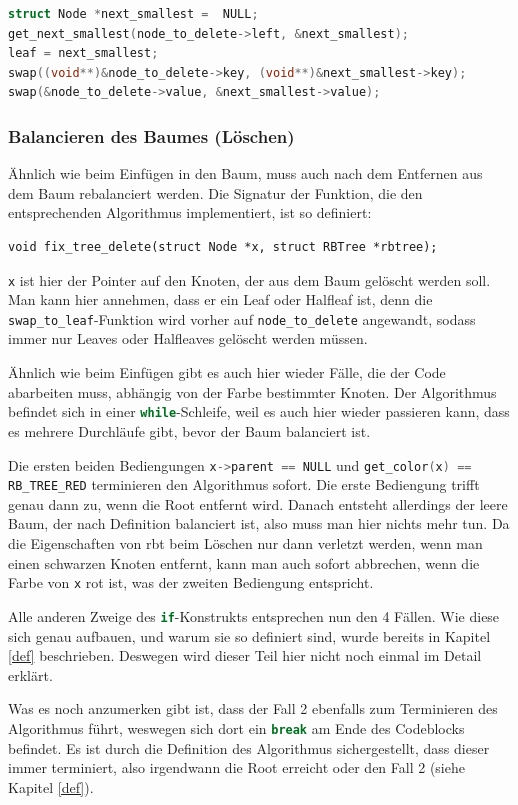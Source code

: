 \documentclass[11pt]{article}
\newcommand{\lstin}[1]{\lstinline[language=C]{#1}}
\begin{document}
\begin{lstlisting}[language=C]
struct Node *next_smallest =  NULL;
get_next_smallest(node_to_delete->left, &next_smallest);
leaf = next_smallest;
swap((void**)&node_to_delete->key, (void**)&next_smallest->key);
swap(&node_to_delete->value, &next_smallest->value);
\end{lstlisting}

\subsubsection{Balancieren des Baumes (Löschen)}
Ähnlich wie beim Einfügen in den Baum, muss auch nach dem Entfernen aus dem Baum rebalanciert werden.
Die Signatur der Funktion, die den entsprechenden Algorithmus implementiert, ist so definiert:
\begin{lstlisting}
void fix_tree_delete(struct Node *x, struct RBTree *rbtree);
\end{lstlisting}

\lstin{x} ist hier der Pointer auf den Knoten, der aus dem Baum gelöscht werden soll. Man kann hier annehmen, dass er ein Leaf oder Halfleaf ist,
denn die \lstin{swap_to_leaf}-Funktion wird vorher auf \lstin{node_to_delete} angewandt, sodass immer nur Leaves oder Halfleaves gelöscht werden müssen.

Ähnlich wie beim Einfügen gibt es auch hier wieder Fälle, die der Code abarbeiten muss, abhängig von der Farbe bestimmter Knoten.
Der Algorithmus befindet sich in einer \lstin{while}-Schleife, weil es auch hier wieder passieren kann, dass es mehrere Durchläufe gibt, bevor der Baum balanciert ist.

Die ersten beiden Bediengungen \lstin{x->parent == NULL} und \lstin{get_color(x) == RB_TREE_RED} terminieren den Algorithmus sofort.
Die erste Bediengung trifft genau dann zu, wenn die Root entfernt wird. Danach entsteht allerdings der leere Baum, der nach Definition balanciert ist, also muss man hier nichts mehr tun.
Da die Eigenschaften von \gls{rbt} beim Löschen nur dann verletzt werden, wenn man einen schwarzen Knoten entfernt,
kann man auch sofort abbrechen, wenn die Farbe von \lstin{x} rot ist, was der zweiten Bediengung entspricht.

Alle anderen Zweige des \lstin{if}-Konstrukts entsprechen nun den 4 Fällen.
Wie diese sich genau aufbauen, und warum sie so definiert sind, wurde bereits in Kapitel \ref{def} beschrieben. Deswegen wird dieser Teil hier nicht noch einmal im Detail erklärt.

Was es noch anzumerken gibt ist, dass der Fall 2 ebenfalls zum Terminieren des Algorithmus führt, weswegen sich dort ein \lstin{break} am Ende des Codeblocks befindet.
Es ist durch die Definition des Algorithmus sichergestellt, dass dieser immer terminiert, also irgendwann die Root erreicht oder den Fall 2 (siehe Kapitel \ref{def}).
\end{document}
